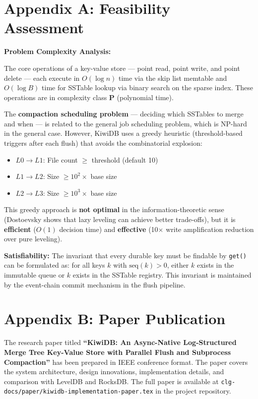 \documentclass[oneside,a4paper,12pt]{book}
\begin{document}
\section{Appendix A: Feasibility Assessment}

\textbf{Problem Complexity Analysis:}

The core operations of a key-value store --- point read, point write, and point delete --- each execute in $O(\log n)$ time via the skip list memtable and $O(\log B)$ time for SSTable lookup via binary search on the sparse index. These operations are in complexity class \textbf{P} (polynomial time).

The \textbf{compaction scheduling problem} --- deciding which SSTables to merge and when --- is related to the general job scheduling problem, which is NP-hard in the general case. However, KiwiDB uses a greedy heuristic (threshold-based triggers after each flush) that avoids the combinatorial explosion:
\begin{itemize}[leftmargin=2em]
    \item $L0 \rightarrow L1$: File count $\geq$ threshold (default 10)
    \item $L1 \rightarrow L2$: Size $\geq 10^2 \times$ base size
    \item $L2 \rightarrow L3$: Size $\geq 10^3 \times$ base size
\end{itemize}

This greedy approach is \textbf{not optimal} in the information-theoretic sense (Dostoevsky \cite{c11} shows that lazy leveling can achieve better trade-offs), but it is \textbf{efficient} ($O(1)$ decision time) and \textbf{effective} (10$\times$ write amplification reduction over pure leveling).

\textbf{Satisfiability:} The invariant that every durable key must be findable by \texttt{get()} can be formulated as: for all keys $k$ with $\text{seq}(k) > 0$, either $k$ exists in the immutable queue or $k$ exists in the SSTable registry. This invariant is maintained by the event-chain commit mechanism in the flush pipeline.

\section{Appendix B: Paper Publication}

The research paper titled \textbf{``KiwiDB: An Async-Native Log-Structured Merge Tree Key-Value Store with Parallel Flush and Subprocess Compaction''} has been prepared in IEEE conference format. The paper covers the system architecture, design innovations, implementation details, and comparison with LevelDB and RocksDB. The full paper is available at \texttt{clg-docs/paper/kiwidb-implementation-paper.tex} in the project repository.
\end{document}
